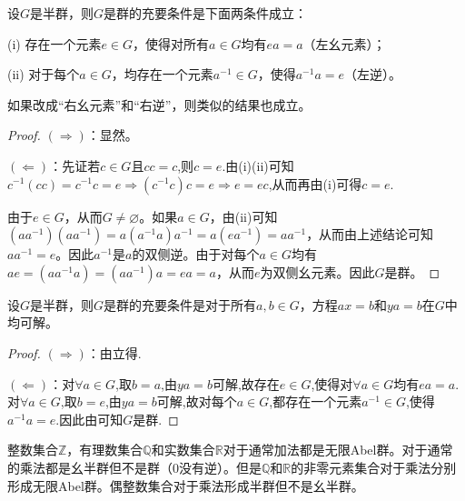 \documentclass[../../main.tex]{subfiles}
\begin{document}
\begin{proposition}\label{proposition:半群是群的充要条件}
设$G$是半群，则$G$是群的充要条件是下面两条件成立：

(i) 存在一个元素$e \in G$，使得对所有$a \in G$均有$ea = a$（左幺元素）；

(ii) 对于每个$a \in G$，均存在一个元素$a^{-1} \in G$，使得$a^{-1}a = e$（左逆）。
\end{proposition}
\begin{remark}
如果改成“右幺元素”和“右逆”，则类似的结果也成立。
\end{remark}
\begin{proof}
$(\Rightarrow)$：显然。

$(\Leftarrow)$：先证若$c\in G$且$cc=c$,则$c=e$.由(i)(ii)可知$c^{-1}(cc)=c^{-1}c=e\Rightarrow (c^{-1}c)c=e\Rightarrow e=ec$,从而再由(i)可得$c=e$.

由于$e \in G$，从而$G \neq \varnothing$。如果$a \in G$，由(ii)可知$(aa^{-1})(aa^{-1}) = a (a^{-1}a) a^{-1} = a(ea^{-1}) = aa^{-1}$，从而由上述结论可知$aa^{-1} = e$。因此$a^{-1}$是$a$的双侧逆。由于对每个$a \in G$均有$ae = (aa^{-1}a) = (aa^{-1}) a = ea = a$，从而$e$为双侧幺元素。因此$G$是群。

\end{proof}

\begin{proposition}
设$G$是半群，则$G$是群的充要条件是对于所有$a, b \in G$，方程$ax = b$和$ya = b$在$G$中均可解。
\end{proposition}
\begin{proof}
$(\Rightarrow)$：由立得.

$(\Leftarrow)$：对$\forall a\in G$,取$b=a$,由$ya=b$可解,故存在$e\in G$,使得对$\forall a\in G$均有$ea=a$.
对$\forall a\in G$,取$b=e$,由$ya=b$可解,故对每个$a\in G$,都存在一个元素$a^{-1}\in G$,使得$a^{-1}a=e$.因此由可知$G$是群.

\end{proof}

\begin{example}
整数集合$\mathbb{Z}$，有理数集合$\mathbb{Q}$和实数集合$\mathbb{R}$对于通常加法都是无限Abel群。对于通常的乘法都是幺半群但不是群（$0$没有逆）。但是$\mathbb{Q}$和$\mathbb{R}$的非零元素集合对于乘法分别形成无限Abel群。偶整数集合对于乘法形成半群但不是幺半群。
\end{example}
\end{document}
